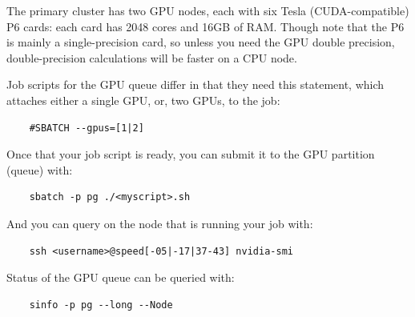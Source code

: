 
The primary cluster has two GPU nodes, each with six Tesla (CUDA-compatible) P6
cards: each card has 2048 cores and 16GB of RAM. Though note that the P6
is mainly a single-precision card, so unless you need the GPU double
precision, double-precision calculations will be faster on a CPU node.

Job scripts for the GPU queue differ in that they
%
%
need this statement, which attaches either a single GPU, or, two
GPUs, to the job:

\begin{verbatim}
    #SBATCH --gpus=[1|2]
    \end{verbatim}
    
    
    Once that your job script is ready, you can submit it to the GPU partition (queue)
    with:

\begin{verbatim}
    sbatch -p pg ./<myscript>.sh
    \end{verbatim}
    
    And you can query  on the node that is running your job with:
    
    \begin{verbatim}
    ssh <username>@speed[-05|-17|37-43] nvidia-smi
    \end{verbatim}
    
    Status of the GPU queue can be queried with:
    
    \begin{verbatim}
    sinfo -p pg --long --Node
    \end{verbatim}
    
